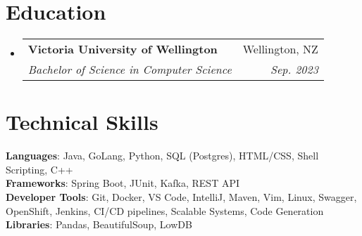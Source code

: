 \documentclass[letterpaper,11pt]{article}
\makeatletter
\newcommand{\resumeItem}[1]{
  \item\small{
    {#1 \vspace{-2pt}}
  }
}
\newcommand{\resumeSubheading}[4]{
  \vspace{-2pt}\item
    \begin{tabular*}{0.97\textwidth}[t]{l@{\extracolsep{\fill}}r}
      \textbf{#1} & #2 \\
      \textit{\small#3} & \textit{\small #4} \\
    \end{tabular*}\vspace{-7pt}
}
\newcommand{\resumeSubSubheading}[2]{
    \item
    \begin{tabular*}{0.97\textwidth}{l@{\extracolsep{\fill}}r}
      \textit{\small#1} & \textit{\small #2} \\
    \end{tabular*}\vspace{-7pt}
}
\newcommand{\resumeSubHeadingListStart}{\begin{itemize}[leftmargin=0.15in, label={}]}
\newcommand{\resumeSubHeadingListEnd}{\end{itemize}}
\newcommand{\resumeItemListStart}{\begin{itemize}\vspace{0pt}}
\newcommand{\resumeItemListEnd}{\end{itemize}\vspace{0pt}}
\makeatother
\begin{document}

\section{Education}
  \resumeSubHeadingListStart
    \resumeSubheading
      {Victoria University of Wellington}{Wellington, NZ}
      {Bachelor of Science in Computer Science}{Sep. 2023}
  \resumeSubHeadingListEnd

\section{Technical Skills}
 \begin{itemize}[leftmargin=0.15in, label={}]
    \small{\item{
     \textbf{Languages}{: Java, GoLang, Python, SQL (Postgres), HTML/CSS, Shell Scripting, C++} \\
     \textbf{Frameworks}{: Spring Boot, JUnit, Kafka, REST API} \\
     \textbf{Developer Tools}{: Git, Docker, VS Code, IntelliJ, Maven, Vim, Linux, Swagger, OpenShift, Jenkins, CI/CD pipelines, Scalable Systems, Code Generation} \\
     \textbf{Libraries}{: Pandas, BeautifulSoup, LowDB}
    }}
\end{itemize}

\end{document}
